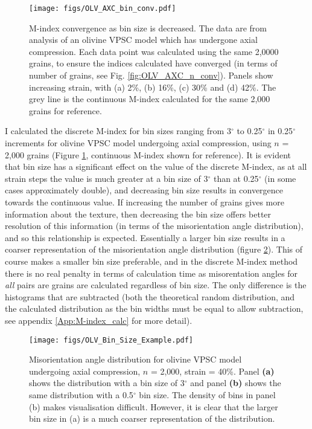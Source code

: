 \documentclass[a4paper,12pt,twoside]{report}
\numberwithin{equation}{chapter}
\begin{document}
\begin{figure}[b!]
  \centering
    \texttt{[image: figs/OLV\_AXC\_bin\_conv.pdf]}
  \caption[Convergence with bin size (olivine)]{M-index convergence as bin size is decreased. The data are from analysis of an olivine VPSC model which has undergone axial compression. Each data point was calculated using the same 2,0000 grains, to ensure the indices calculated have converged (in terms of number of grains, see Fig. \ref{fig:OLV_AXC_n_conv}). Panels show increasing strain, with (a) 2\%, (b) 16\%, (c) 30\% and (d) 42\%. The grey line is the continuous M-index calculated for the same 2,000 grains for reference.}
  \label{fig:OLV_AXC_b_conv}
\end{figure}  

I calculated the discrete M-index for bin sizes ranging from 3$^\circ$ to 0.25$^\circ$ in 0.25$^\circ$ increments for olivine VPSC model undergoing axial compression, using $n$ = 2,000 grains (Figure \ref{fig:OLV_AXC_b_conv}, continuous M-index shown for reference). It is evident that bin size has a significant effect on the value of the discrete M-index, as at all strain steps the value is much greater at a bin size of 3$^\circ$ than at 0.25$^\circ$ (in some cases approximately double), and decreasing bin size results in convergence towards the continuous value. If increasing the number of grains gives more information about the texture, then decreasing the bin size offers better resolution of this information (in terms of the misorientation angle distribution), and so this relationship is expected. Essentially a larger bin size results in a coarser representation of the misorientation angle distribution (figure \ref{fig:OLV_bin_size_example}). This of course makes a smaller bin size preferable, and in the discrete M-index method there is no real penalty in terms of calculation time as misorentation angles for \emph{all} pairs are grains are calculated regardless of bin size. The only difference is the histograms that are subtracted (both the theoretical random distribution, and the calculated distribution as the bin widths must be equal to allow subtraction, see appendix \ref{App:M-index_calc} for more detail).

\begin{figure}[h]
  \centering
    \texttt{[image: figs/OLV\_Bin\_Size\_Example.pdf]}
  \caption[Bin size example (olivine VPSC)]{Misorientation angle distribution for olivine VPSC model undergoing axial compression, $n$ = 2,000, strain = 40\%. Panel \textbf{(a)} shows the distribution with a bin size of 3$^\circ$ and panel \textbf{(b)} shows the same distribution with a 0.5$^\circ$ bin size. The density of bins in panel (b) makes visualisation difficult. However, it is clear that the larger bin size in (a) is a much coarser representation of the distribution.}
  \label{fig:OLV_bin_size_example}
\end{figure}  
\end{document}
